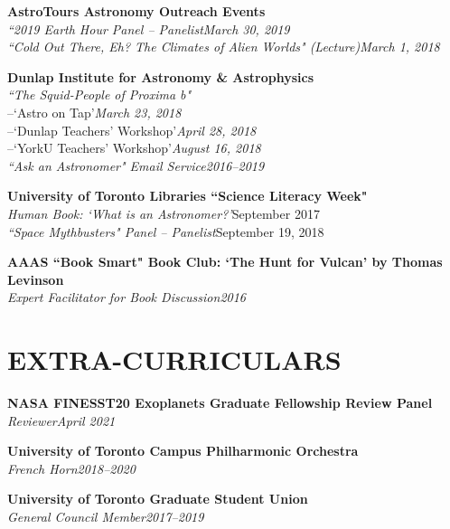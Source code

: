 \documentclass[10pt]{res} %
\begin{document}
\begin{resume}
\textbf{AstroTours Astronomy Outreach Events}\\
{\sl ``2019 Earth Hour Panel -- Panelist}\hfill{\sl March 30, 2019}\\
{\sl ``Cold Out There, Eh? The Climates of Alien Worlds" (Lecture)}\hfill{\sl March 1, 2018}%

\textbf{Dunlap Institute for Astronomy \& Astrophysics}\\
{\sl ``The Squid-People of Proxima b"}\\
 {--\hspace{10mm}`Astro on Tap'}\hfill{\sl March 23, 2018}\\
 {--\hspace{10mm}`Dunlap Teachers' Workshop'}\hfill{\sl April 28, 2018}\\
 {--\hspace{10mm}`YorkU Teachers' Workshop'}\hfill{\sl August 16, 2018}\\
{\sl ``Ask an Astronomer" Email Service}\hfill{\sl 2016--2019}%

\textbf{University of Toronto Libraries ``Science Literacy Week"}\\
{\sl Human Book: `What is an Astronomer?'}\hfill{September 2017}\\
{\sl ``Space Mythbusters" Panel -- Panelist}\hfill{September 19, 2018}

\textbf{AAAS ``Book Smart" Book Club: `The Hunt for Vulcan' by Thomas Levinson}\\
{\sl Expert Facilitator for Book Discussion}\hfill{\sl 2016}

\section{EXTRA-CURRICULARS} 
% 
\textbf{NASA FINESST20 Exoplanets Graduate Fellowship Review Panel}\\
{\sl Reviewer}\hfill{\sl April 2021}

 \textbf{University of Toronto Campus Philharmonic Orchestra}\\
{\sl French Horn}\hfill{\sl 2018--2020}

\textbf{University of Toronto Graduate Student Union}\\
{\sl General Council Member}\hfill{\sl 2017--2019}


\end{resume}
\end{document}
